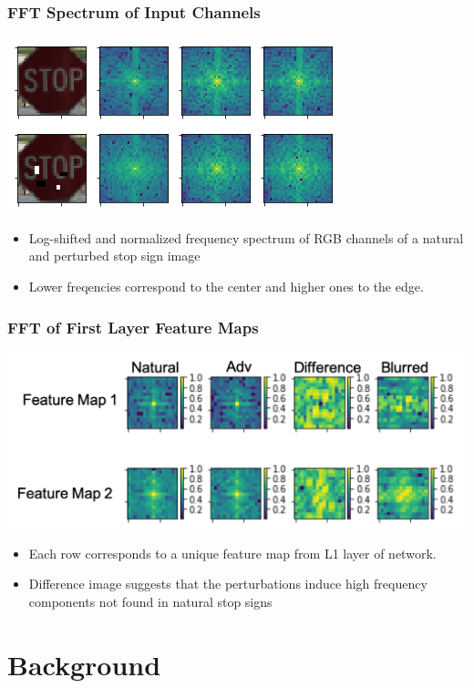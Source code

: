 \documentclass{beamer}
\begin{document}
\begin{frame}
\frametitle{FFT Spectrum of Input Channels}
\begin{center}
	\includegraphics[scale=0.7]{regular_blur.png}
\end{center}
\begin{itemize}
	\item Log-shifted and normalized frequency spectrum of RGB channels of a natural and perturbed stop sign image
	\pause
	\item Lower freqencies correspond to the center and higher ones to the edge.  
\end{itemize}
\end{frame}

\begin{frame}
\frametitle{FFT of First Layer Feature Maps}
\begin{center}
	\includegraphics[scale=0.5]{fft_feat_maps_labeled.png}
\end{center}
\begin{itemize}
	\item Each row corresponds to a unique feature map from L1 layer of network.
	\pause
	\item Difference image suggests that the perturbations induce high frequency components not found in natural stop signs
\end{itemize}
\end{frame}

\section{Background}
\end{document}
